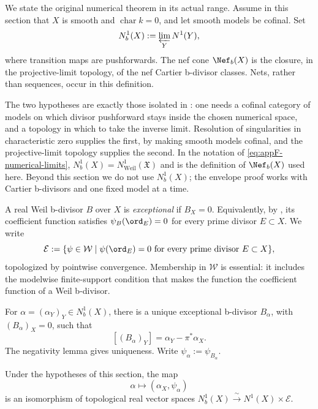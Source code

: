 We state the original numerical theorem in its actual range.  Assume in this
section that $X$ is smooth and $\operatorname{char}k=0$, and let smooth
models be cofinal.  Set
\begin{equation}
\label{eq:bdivisor-class-space}
 N_b^1(X):=\varprojlim_Y N^1(Y),
\end{equation}
where transition maps are pushforwards.  The nef cone
$\Nef_b(X)$ is the closure, in the projective-limit topology, of the nef
Cartier b-divisor classes.  Nets, rather than sequences, occur in this
definition.

The two hypotheses are exactly those isolated in
: one needs a cofinal category of models on
which divisor pushforward stays inside the chosen numerical space, and a
topology in which to take the inverse limit.  Resolution of singularities in
characteristic zero supplies the first, by making smooth models cofinal, and
the projective-limit topology supplies the second.  In the notation of
\eqref{eq:appF-numerical-limits}, $N^1_b(X)=N^1_{\mathrm{Weil}}(\mathfrak X)$
and  is the definition of $\Nef_b(X)$ used
here.  Beyond this section we do not use $N^1_b(X)$; the envelope proof
works with Cartier b-divisors and one fixed model at a time.

\begin{definition}
\label{def:ch35-exceptional-bdivisor}
A real Weil b-divisor $B$ over $X$ is \emph{exceptional} if
$B_X=0$.  Equivalently, by
, its coefficient function
satisfies $\psi_B(\ord_E)=0$ for every prime divisor $E\subset X$.  We
write
\[
 \mathcal E:=\{\psi\in\mathcal W\mid
 \psi(\ord_E)=0\text{ for every prime divisor }E\subset X\},
\]
topologized by pointwise convergence.  Membership in $\mathcal W$ is
essential: it includes the modelwise finite-support condition that makes
the function the coefficient function of a Weil b-divisor.
\end{definition}

For $\alpha=(\alpha_Y)_Y\in N_b^1(X)$, there is a unique exceptional
b-divisor $B_\alpha$, with $(B_\alpha)_X=0$, such that
\begin{equation}
\label{eq:exceptional-bdivisor-class}
 [(B_\alpha)_Y]=\alpha_Y-\pi^*\alpha_X.
\end{equation}
The negativity lemma gives uniqueness.  Write
$\psi_\alpha:=\psi_{B_\alpha}$.

\begin{lemma}
\label{lem:ch35-bclass-splitting}
Under the hypotheses of this section, the map
\begin{equation}
\label{eq:ch35-bclass-splitting}
 \alpha\longmapsto(\alpha_X,\psi_\alpha)
\end{equation}
is an isomorphism of topological real vector spaces
$N^1_b(X)\xrightarrow{\ \sim\ }N^1(X)\times\mathcal E$.
\end{lemma}

